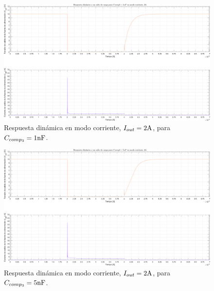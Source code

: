 \clearpage

\begin{figure}[H] %
\begin{center}
\includegraphics[width=1.1 \textwidth, angle=90]{./img/plots/dynamic/power_supply_CCOMP3_1n_STEP_Modo3.png}
\caption{\label{fig:fig_power_supply_CCOMP3_STEP_1n_Modo3}\footnotesize{Respuesta dinámica en modo corriente, $I_{out} = 2 \si[per-mode=symbol]{\ampere}$, para $C_{comp_{3}} = 1 \si[per-mode=symbol]{\nano\farad} $.}}
\end{center}
\end{figure}

\clearpage

\begin{figure}[H] %
\begin{center}
\includegraphics[width=1.1 \textwidth, angle=90]{./img/plots/dynamic/power_supply_CCOMP3_5n_STEP_Modo3.png}
\caption{\label{fig:fig_power_supply_CCOMP3_STEP_5n_Modo3}\footnotesize{Respuesta dinámica en modo corriente, $I_{out} = 2 \si[per-mode=symbol]{\ampere}$, para $C_{comp_{3}} = 5 \si[per-mode=symbol]{\nano\farad} $.}}
\end{center}
\end{figure}

